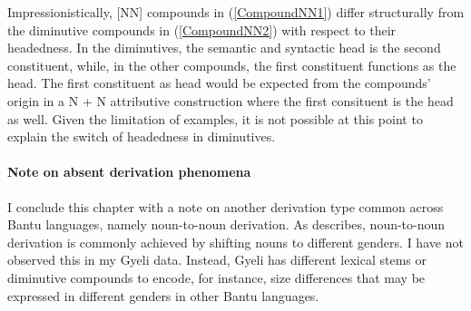 Impressionistically, [NN] compounds in (\ref{CompoundNN1}) differ structurally from the diminutive compounds in (\ref{CompoundNN2}) with respect to their headedness. In the diminutives, the semantic and syntactic head is the second constituent, while, in the other compounds, the first constituent functions as the head. The first constituent as head would be expected from the compounds' origin in a N + N attributive construction where the first consituent is the head as well. Given the limitation of examples, it is not possible at this point to explain the switch of headedness in diminutives.


\paragraph{Note on absent derivation phenomena} I conclude this chapter with a note on another derivation type common across Bantu languages, namely noun-to-noun derivation. As \citet[82]{schadeberg2003} describes, noun-to-noun derivation is commonly achieved by shifting nouns to different genders. I have not  observed this in my Gyeli data. Instead, Gyeli has different lexical stems or diminutive compounds to encode, for instance, size differences that may be expressed in different genders in other Bantu languages. 
